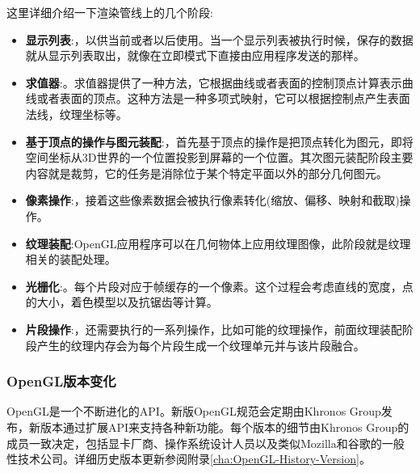 这里详细介绍一下渲染管线上的几个阶段:
\begin{itemize}
\item{\textbf{显示列表}}:，以供当前或者以后使用。当一个显示列表被执行时候，保存的数据就从显示列表取出，就像在立即模式下直接由应用程序发送的那样。
\item{\textbf{求值器}}:。求值器提供了一种方法，它根据曲线或者表面的控制顶点计算表示曲线或者表面的顶点。这种方法是一种多项式映射，它可以根据控制点产生表面法线，纹理坐标等。
\item{\textbf{基于顶点的操作与图元装配}}:，首先基于顶点的操作是把顶点转化为图元，即将空间坐标从3D世界的一个位置投影到屏幕的一个位置。其次图元装配阶段主要内容就是裁剪，它的任务是消除位于某个特定平面以外的部分几何图元。
\item{\textbf{像素操作}}:，接着这些像素数据会被执行像素转化(缩放、偏移、映射和截取)操作。
\item{\textbf{纹理装配}}:\quad OpenGL应用程序可以在几何物体上应用纹理图像，此阶段就是纹理相关的装配处理。
\item{\textbf{光栅化}}:。每个片段对应于帧缓存的一个像素。这个过程会考虑直线的宽度，点的大小，着色模型以及抗锯齿等计算。
\item{\textbf{片段操作}}:，还需要执行的一系列操作，比如可能的纹理操作，前面纹理装配阶段产生的纹理内存会为每个片段生成一个纹理单元并与该片段融合。
\end{itemize}

\subsubsection{OpenGL版本变化}
OpenGL是一个不断进化的API。新版OpenGL规范会定期由Khronos Group发布，新版本通过扩展API来支持各种新功能。每个版本的细节由Khronos Group的成员一致决定，包括显卡厂商、操作系统设计人员以及类似Mozilla和谷歌的一般性技术公司。详细历史版本更新参阅附录\ref{cha:OpenGL-History-Version}。

